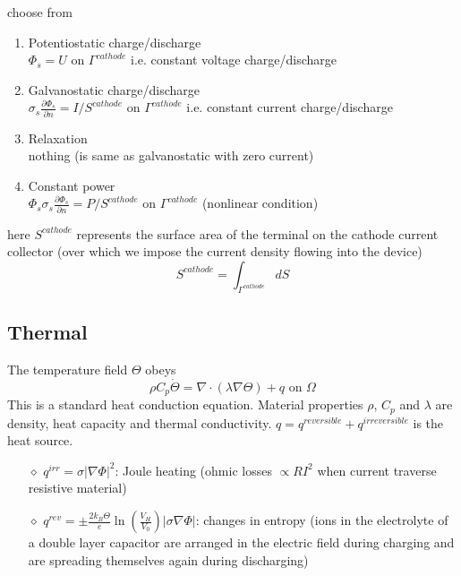 \documentclass[10pt, oneside]{article}   	%
\begin{document}
choose from
\begin{enumerate}
\item Potentiostatic charge/discharge \\
$\Phi_s = U \text{\ on\ } \Gamma^{cathode}$
i.e. constant voltage charge/discharge

\item Galvanostatic charge/discharge \\
$\sigma_s \frac{\partial \Phi_s}{\partial n} = I / S^{cathode} \text{\ on\ } \Gamma^{cathode}$
i.e. constant current charge/discharge

\item Relaxation \\
nothing (is same as galvanostatic with zero current)

\item Constant power \\
$\Phi_s \sigma_s \frac{\partial \Phi_s}{\partial n} = P / S^{cathode} \text{\ on\ } \Gamma^{cathode}$
(nonlinear condition)
\end{enumerate}

here $S^{cathode}$ represents the surface area of the terminal on the cathode
current collector (over which we impose the current density flowing into the
device)
\begin{equation}
S^{cathode} = \int_{\Gamma^{cathode}} dS
\end{equation}

\subsection{Thermal}

The temperature field $\Theta$ obeys
\begin{equation}
\rho C_p \dot{\Theta} = \nabla \cdot (\lambda \nabla \Theta) + q \text{ on } \Omega
\label{eq:heat_conduction}
\end{equation}
This is a standard heat conduction equation.
Material properties $\rho$, $C_p$ and $\lambda$ are density, heat capacity and
thermal conductivity.
$q=q^{reversible}+q^{irreversible}$ is the heat source.
\begin{itemize}
\item[$\diamond$] $q^{irr} = \sigma | \nabla \Phi |^2$: Joule heating (ohmic
losses $\propto R I^2$ when current traverse resistive material)

\item[$\diamond$] $q^{rev} = \pm \frac{2 k_B \Theta}{e} \ln(\frac{V_H}{V_0}) |
\sigma \nabla \Phi |$: changes in entropy (ions in the electrolyte of a double
layer capacitor are arranged in the electric field during charging and are
spreading themselves again during discharging)
\end{itemize}
\end{document}
